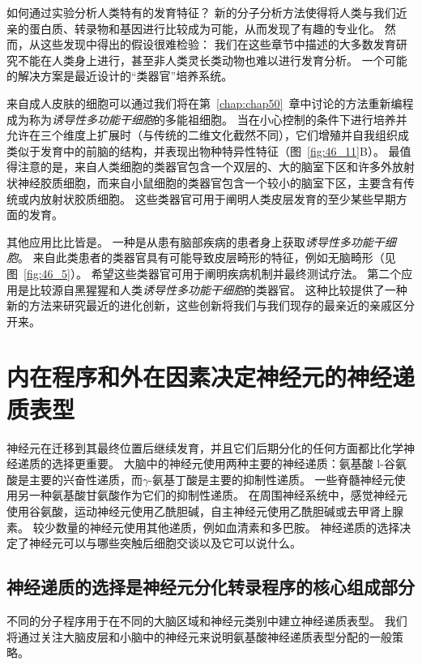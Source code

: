 如何通过实验分析人类特有的发育特征？
新的分子分析方法使得将人类与我们近亲的蛋白质、转录物和基因进行比较成为可能，从而发现了有趣的专业化。
然而，从这些发现中得出的假设很难检验：
我们在这些章节中描述的大多数发育研究不能在人类身上进行，甚至非人类灵长类动物也难以进行发育分析。
一个可能的解决方案是最近设计的“类器官”培养系统。


来自成人皮肤的细胞可以通过我们将在第~\ref{chap:chap50}~章中讨论的方法重新编程成为称为\textit{诱导性多功能干细胞}的多能祖细胞。
当在小心控制的条件下进行培养并允许在三个维度上扩展时（与传统的二维文化截然不同），它们增殖并自我组织成类似于发育中的前脑的结构，并表现出物种特异性特征（图~\ref{fig:46_11}B）。
最值得注意的是，来自人类细胞的类器官包含一个双层的、大的脑室下区和许多外放射状神经胶质细胞，而来自小鼠细胞的类器官包含一个较小的脑室下区，主要含有传统或内放射状胶质细胞。
这些类器官可用于阐明人类皮层发育的至少某些早期方面的发育。


其他应用比比皆是。
一种是从患有脑部疾病的患者身上获取\textit{诱导性多功能干细胞}。
来自此类患者的类器官具有可能导致皮层畸形的特征，例如无脑畸形（见图~\ref{fig:46_5}）。
希望这些类器官可用于阐明疾病机制并最终测试疗法。
第二个应用是比较源自黑猩猩和人类\textit{诱导性多功能干细胞}的类器官。
这种比较提供了一种新的方法来研究最近的进化创新，这些创新将我们与我们现存的最亲近的亲戚区分开来。


\section{内在程序和外在因素决定神经元的神经递质表型}

神经元在迁移到其最终位置后继续发育，并且它们后期分化的任何方面都比化学神经递质的选择更重要。
大脑中的神经元使用两种主要的神经递质：氨基酸 l-谷氨酸是主要的兴奋性递质，而$\gamma$-氨基丁酸是主要的抑制性递质。
一些脊髓神经元使用另一种氨基酸甘氨酸作为它们的抑制性递质。
在周围神经系统中，感觉神经元使用谷氨酸，运动神经元使用乙酰胆碱，自主神经元使用乙酰胆碱或去甲肾上腺素。
较少数量的神经元使用其他递质，例如血清素和多巴胺。
神经递质的选择决定了神经元可以与哪些突触后细胞交谈以及它可以说什么。



\subsection{神经递质的选择是神经元分化转录程序的核心组成部分}

不同的分子程序用于在不同的大脑区域和神经元类别中建立神经递质表型。
我们将通过关注大脑皮层和小脑中的神经元来说明氨基酸神经递质表型分配的一般策略。



